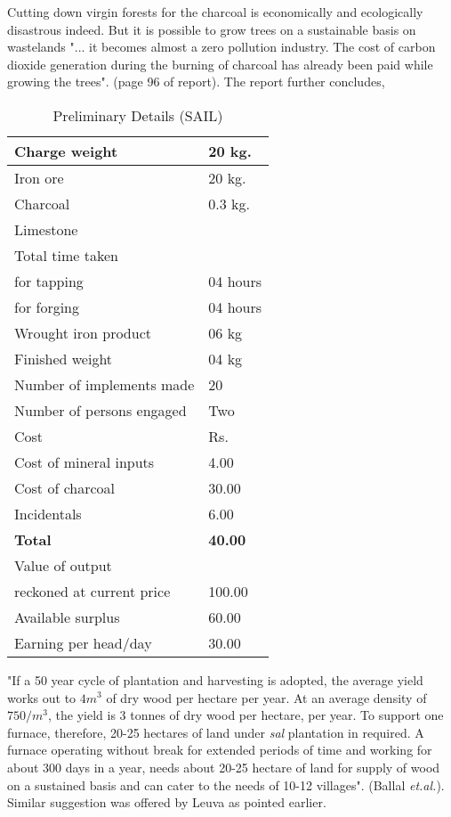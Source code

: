 Cutting down virgin forests for the charcoal is economically and ecologically disastrous indeed. But it is possible to grow trees on a sustainable basis on wastelands "... it becomes almost a zero pollution industry. The cost of carbon dioxide generation during the burning of charcoal has already been paid while growing the trees". (page 96 of report). The report further concludes, 

\begin{longtable}{|l|l|}
\caption{Preliminary Details (SAIL)}\label{table 8.3}\\
\hline
Charge weight & 20 kg.\\
\hline
Iron ore & 20 kg.\\
\hline
Charcoal & 0.3 kg.\\
\hline
Limestone & \\
\hline
Total time taken & \\
\hline
for tapping & 04 hours\\
\hline
for forging & 04 hours\\
\hline
Wrought iron product  & 06 kg\\
\hline
Finished weight & 04 kg\\
\hline
Number of implements made & 20\\
\hline
Number of persons engaged& Two\\
\hline
Cost & Rs.\\
\hline
Cost of mineral inputs & 4.00\\
\hline
Cost of charcoal & 30.00\\
\hline
Incidentals & 6.00\\
\hline
\textbf{Total} & \textbf{40.00}\\
\hline
Value of output & \\
\hline
reckoned at current price & 100.00\\
\hline
Available surplus & 60.00\\
\hline
Earning per head/day & 30.00\\
\hline
\end{longtable}

"If a 50 year cycle of plantation and harvesting is adopted, the average yield works out to $4m^3$ of dry wood per hectare per year. At an average density of $750/m^3$, the yield is 3 tonnes of dry wood per hectare, per year. To support one furnace, therefore, 20-25 hectares of land under {\it sal} plantation in required. A furnace operating without break for extended periods of time and working for about 300 days in a year, needs about 20-25 hectare of land for supply of wood on a sustained basis and can cater to the needs of 10-12 villages". (Ballal {\it et.al.}). Similar suggestion was offered by Leuva as pointed earlier.

